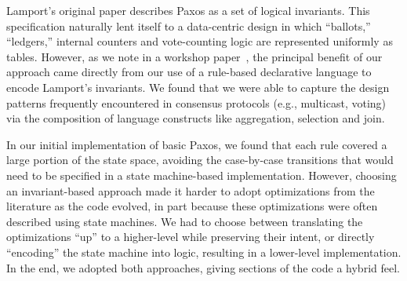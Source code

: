 Lamport's original paper describes Paxos as a set of logical invariants.  This
specification naturally lent itself to a data-centric design in which
``ballots,'' ``ledgers,'' internal counters and vote-counting logic are
represented uniformly as tables.  However, as we note in a workshop
paper~\cite{netdb-declare}, the principal benefit of our approach came directly
from our use of a rule-based declarative language to encode Lamport's
invariants.  We found that we were able to capture the design patterns
frequently encountered in consensus protocols (e.g., multicast, voting) via the
composition of language constructs like aggregation, selection and join.

In our initial implementation of basic Paxos, we found that each rule covered a
large portion of the state space, avoiding the case-by-case transitions that
would need to be specified in a state machine-based implementation.  However,
choosing an invariant-based approach made it harder to adopt optimizations from
the literature as the code evolved, in part because these optimizations were
often described using state machines. We had to choose between translating the
optimizations ``up'' to a higher-level while preserving their intent, or
directly ``encoding'' the state machine into logic, resulting in a
lower-level implementation.  In the end, we adopted both approaches, giving
sections of the code a hybrid feel.



